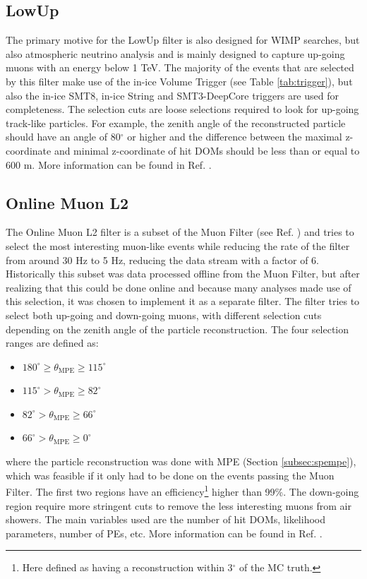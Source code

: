 
\subsection{LowUp}
The primary motive for the LowUp filter is also designed for WIMP searches, but also atmospheric neutrino analysis and is mainly designed to capture up-going muons with an energy below 1 TeV. The majority of the events that are selected by this filter make use of the in-ice Volume Trigger (see Table \ref{tab:trigger}), but also the in-ice SMT8, in-ice String and SMT3-DeepCore triggers are used for completeness. The selection cuts are loose selections required to look for up-going track-like particles. For example, the zenith angle of the reconstructed particle should have an angle of 80$^\circ$ or higher and the difference between the maximal z-coordinate and minimal z-coordinate of hit DOMs should be less than or equal to 600 m. More information can be found in Ref. \cite{LowUp2012}.


\subsection{Online Muon L2}
The Online Muon L2 filter is a subset of the Muon Filter (see Ref. \cite{Muon2012}) and tries to select the most interesting muon-like events while reducing the rate of the filter from around 30 Hz to 5 Hz, reducing the data stream with a factor of 6. Historically this subset was data processed offline from the Muon Filter, but after realizing that this could be done online and because many analyses made use of this selection, it was chosen to implement it as a separate filter. The filter tries to select both up-going and down-going muons, with different selection cuts depending on the zenith angle of the particle reconstruction. The four selection ranges are defined as:
\vspace{2mm}
\begin{itemize}
\item $180^\circ \geq \theta_\textrm{MPE} \geq 115^\circ$
\item $115^\circ > \theta_\textrm{MPE} \geq 82^\circ$
\item $82^\circ > \theta_\textrm{MPE} \geq 66^\circ$
\item $66^\circ > \theta_\textrm{MPE} \geq 0^\circ$
\end{itemize}
\vspace{2mm}
where the particle reconstruction was done with MPE (Section \ref{subsec:spempe}), which was feasible if it only had to be done on the events passing the Muon Filter. The first two regions have an efficiency\footnote{Here defined as having a reconstruction within 3$^\circ$ of the MC truth.} higher than 99\%. The down-going region require more stringent cuts to remove the less interesting muons from air showers. The main variables used are the number of hit DOMs, likelihood parameters, number of PEs, etc. More information can be found in Ref. \cite{OnlineMuonL22012}.

